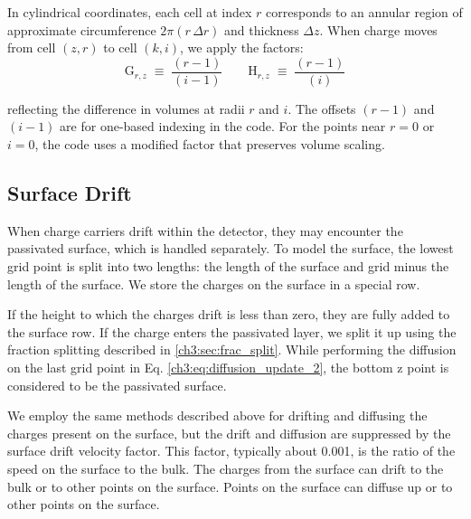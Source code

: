 In cylindrical coordinates, each cell at index $r$ corresponds to an annular region of approximate circumference $2\pi (r \,\Delta r)$ and thickness $\Delta z$. When charge moves from cell $(z,r)$ to cell $(k,i)$, we apply the factors:
\[
\text{G}_{r,z} \;\equiv\; \frac{(r-1)}{(i-1)}
\qquad
\text{H}_{r,z} \;\equiv\; \frac{(r-1)}{(i)}
\] 

reflecting the difference in volumes at radii $r$ and $i$.
The offsets $(r-1)$ and $(i-1)$ are for one-based indexing in the code. For the points near $r=0$ or $i=0$, the code uses a modified factor that preserves volume scaling. 


\subsection{Surface Drift}

When charge carriers drift within the detector, they may encounter the passivated surface, which is handled separately. To model the surface, the lowest grid point is split into two lengths: the length of the surface and grid minus the length of the surface. We store the charges on the surface in a special row. 

If the height to which the charges drift is less than zero, they are fully added to the surface row. If the charge enters the passivated layer, we split it up using the fraction splitting described in \ref{ch3:sec:frac_split}. While performing the diffusion on the last grid point in Eq. \ref{ch3:eq:diffusion_update_2}, the bottom z point is considered to be the passivated surface. 


We employ the same methods described above for drifting and diffusing the charges present on the surface, but the drift and diffusion are suppressed by the surface drift velocity factor. This factor, typically about 0.001, is the ratio of the speed on the surface to the bulk. The charges from the surface can drift to the bulk or to other points on the surface. Points on the surface can diffuse up or to other points on the surface.

